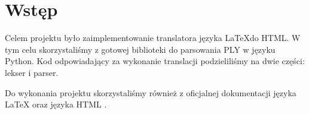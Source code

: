 \chapter{Wstęp}

Celem projektu było zaimplementowanie translatora języka \LaTeX \space do HTML. W tym celu skorzystaliśmy z gotowej
biblioteki do parsowania PLY \cite{ply} w języku Python. Kod odpowiadający za wykonanie translacji 
podzieliliśmy na dwie części: lekser i parser. 

Do wykonania projektu skorzystaliśmy również z oficjalnej dokumentacji języka \LaTeX \space \cite{overleaf} 
oraz języka HTML \cite{html}.